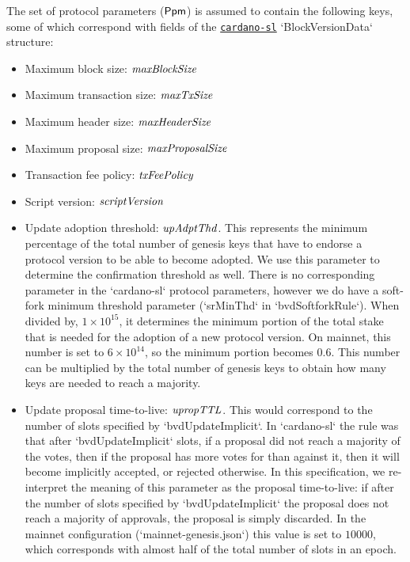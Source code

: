 The set of protocol parameters ($\mathsf{Ppm}$) is assumed to contain the following
keys, some of which correspond with fields of the
\href{https://github.com/input-output-hk/cardano-sl/}{\texttt{cardano-sl}}
`BlockVersionData` structure:
\begin{itemize}
\item Maximum block size: $\mathit{maxBlockSize}$
\item Maximum transaction size: $\mathit{maxTxSize}$
\item Maximum header size: $\mathit{maxHeaderSize}$
\item Maximum proposal size: $\mathit{maxProposalSize}$
\item Transaction fee policy: $\mathit{txFeePolicy}$
\item Script version: $\mathit{scriptVersion}$
\item Update adoption threshold: $\mathit{upAdptThd}$. This represents the minimum
  percentage of the total number of genesis keys that have to endorse a protocol
  version to be able to become adopted. We use this parameter to determine the
  confirmation threshold as well. There is no corresponding parameter in the
  `cardano-sl` protocol parameters, however we do have a soft-fork minimum
  threshold parameter (`srMinThd` in `bvdSoftforkRule`). When divided by,
  $1\times 10^{15}$, it determines the minimum portion of the total stake that
  is needed for the adoption of a new protocol version. On mainnet, this number
  is set to $6 \times 10^{14}$, so the minimum portion becomes $0.6$. This
  number can be multiplied by the total number of genesis keys to obtain how
  many keys are needed to reach a majority.
\item Update proposal time-to-live: $\mathit{upropTTL}$. This would correspond to
  the number of slots specified by `bvdUpdateImplicit`. In `cardano-sl` the
  rule was that after `bvdUpdateImplicit` slots, if a proposal did not reach a
  majority of the votes, then if the proposal has more votes for than against
  it, then it will become implicitly accepted, or rejected otherwise. In this
  specification, we re-interpret the meaning of this parameter as the proposal
  time-to-live: if after the number of slots specified by `bvdUpdateImplicit`
  the proposal does not reach a majority of approvals, the proposal is simply
  discarded. In the mainnet configuration (`mainnet-genesis.json`) this value is
  set to $10000$, which corresponds with almost half of the total number of
  slots in an epoch.
\end{itemize}


